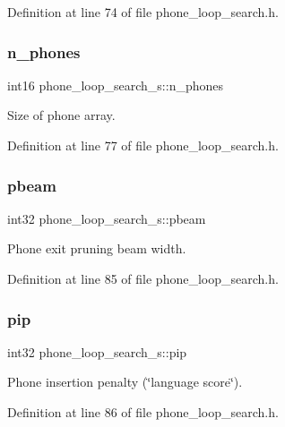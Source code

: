Definition at line 74 of file phone\+\_\+loop\+\_\+search.\+h.

\mbox{\label{structphone__loop__search__s_a7844f45806d19d229504378da16bdc4c}} 
\subsubsection{n\+\_\+phones}
{\footnotesize\ttfamily int16 phone\+\_\+loop\+\_\+search\+\_\+s\+::n\+\_\+phones}



Size of phone array. 



Definition at line 77 of file phone\+\_\+loop\+\_\+search.\+h.

\mbox{\label{structphone__loop__search__s_aaace8b677a536e41bb4616e6695b11d3}} 
\subsubsection{pbeam}
{\footnotesize\ttfamily int32 phone\+\_\+loop\+\_\+search\+\_\+s\+::pbeam}



Phone exit pruning beam width. 



Definition at line 85 of file phone\+\_\+loop\+\_\+search.\+h.

\mbox{\label{structphone__loop__search__s_ac979bc57a659c7853eec1854dbcbfabe}} 
\subsubsection{pip}
{\footnotesize\ttfamily int32 phone\+\_\+loop\+\_\+search\+\_\+s\+::pip}



Phone insertion penalty (\char`\"{}language score\char`\"{}). 



Definition at line 86 of file phone\+\_\+loop\+\_\+search.\+h.


